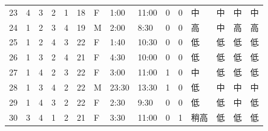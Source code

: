 \begin{table}[htbp]
{\begin{tabular}{lllllllllllllll}
23                  & 4                      & 3                       & 2                      & 1                       & 18                     & F                   & 1:00                  & 11:00                 & 0                    & 0                    & 中       & 中       & 中    & 中  \\
24                  & 1                      & 2                       & 3                      & 4                       & 19                     & M                   & 2:00                  & 8:30                  & 0                    & 0                    & 高       & 中       & 高    & 高  \\
25                  & 1                      & 2                       & 4                      & 3                       & 22                     & F                   & 1:40                  & 10:30                 & 0                    & 0                    & 低       & 低       & 低    & 低  \\
26                  & 1                      & 3                       & 2                      & 4                       & 21                     & F                   & 4:30                  & 10:00                 & 0                    & 0                    & 低       & 低       & 低    & 低  \\
27                  & 1                      & 4                       & 2                      & 3                       & 22                     & F                   & 3:00                  & 11:00                 & 1                    & 0                    & 中       & 低       & 低    & 低  \\
28                  & 1                      & 3                       & 4                      & 2                       & 22                     & M                   & 23:30                 & 13:30                 & 1                    & 0                    & 低       & 中       & 中    & 中  \\
29                  & 1                      & 4                       & 3                      & 2                       & 22                     & F                   & 2:30                  & 9:30                  & 0                    & 0                    & 低       & 低       & 中    & 低  \\
30                  & 3                      & 4                       & 1                      & 2                       & 21                     & F                   & 3:30                  & 11:00                 & 0                    & 1                    & 稍高      & 低       & 低    & 低  \\

\end{tabular}}
\end{table}
